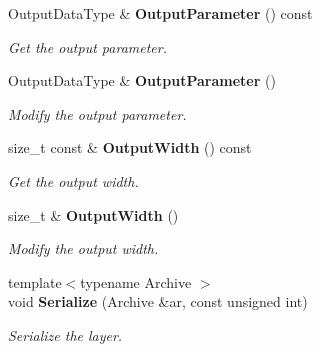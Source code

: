 \begin{DoxyCompactItemize}
Output\+Data\+Type \& {\bf Output\+Parameter} () const 
\begin{DoxyCompactList}\small\item\em Get the output parameter. \end{DoxyCompactList}\item 
Output\+Data\+Type \& {\bf Output\+Parameter} ()
\begin{DoxyCompactList}\small\item\em Modify the output parameter. \end{DoxyCompactList}\item 
size\+\_\+t const \& {\bf Output\+Width} () const 
\begin{DoxyCompactList}\small\item\em Get the output width. \end{DoxyCompactList}\item 
size\+\_\+t \& {\bf Output\+Width} ()
\begin{DoxyCompactList}\small\item\em Modify the output width. \end{DoxyCompactList}\item 
{\footnotesize template$<$typename Archive $>$ }\\void {\bf Serialize} (Archive \&ar, const unsigned int)
\begin{DoxyCompactList}\small\item\em Serialize the layer. \end{DoxyCompactList}\end{DoxyCompactItemize}
